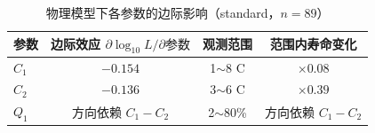 \documentclass[withoutpreface]{cumcmthesis}
\begin{document}
\begin{table}[htbp]
\centering
\caption{物理模型下各参数的边际影响（standard，$n=89$）}
\label{tab:sen}
\begin{tabular}{lccc}
\toprule
参数 & 边际效应 $\partial\log_{10}L/\partial\text{参数}$ & 观测范围 & 范围内寿命变化 \\
\midrule
$C_1$ & $-0.154$ & 1$\sim$8 C & $\times0.08$ \\
$C_2$ & $-0.136$ & 3$\sim$6 C & $\times0.39$ \\
$Q_1$ & 方向依赖 $C_1-C_2$ & 2$\sim$80\% & 方向依赖 $C_1-C_2$ \\
\bottomrule
\end{tabular}
\end{table}



\end{document}
